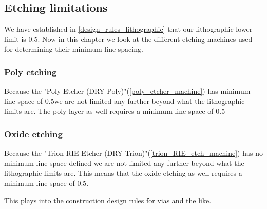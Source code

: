 \subsection{Etching limitations}
We have established in \autoref{design_rules_lithographic} that our lithographic lower limit is 0.5\um.
Now in this chapter we look at the different etching machines used for determining their minimum line spacing.

\subsubsection{Poly etching}
Because the "Poly Etcher (DRY-Poly)"(\autoref{poly_etcher_machine}) has minimum line space of 0.5\um we are not limited any further beyond what the lithographic limits are.
The poly layer as well requires a minimum line space of 0.5\um

\subsubsection{Oxide etching}
Because the "Trion RIE Etcher (DRY-Trion)"(\autoref{trion_RIE_etch_machine}) has no minimum line space defined we are not limited any further beyond what the lithographic limits are.
This means that the oxide etching as well requires a minimum line space of 0.5\um.

This plays into the construction design rules for vias and the like.
